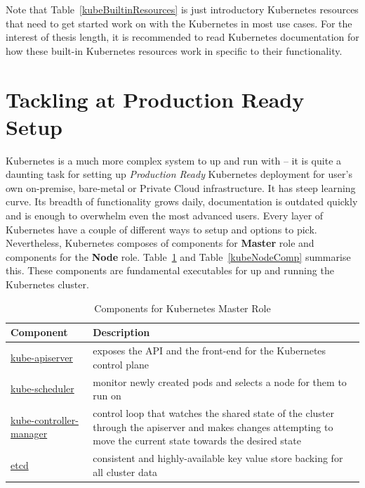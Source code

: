 Note that Table~\ref{kubeBuiltinResources} is just introductory Kubernetes resources that need to get started work on with the Kubernetes in most use cases. For the interest of thesis length, it is recommended to read Kubernetes documentation \parencite{kubeDoc} for how these built-in Kubernetes resources work in specific to their functionality.

\section{Tackling at Production Ready Setup}

Kubernetes is a much more complex system to up and run with -- it is quite a daunting task for setting up \emph{Production Ready} Kubernetes deployment for user's own on-premise, bare-metal or Private Cloud infrastructure. It has steep learning curve. Its breadth of functionality grows daily, documentation is outdated quickly and is enough to overwhelm even the most advanced users. Every layer of Kubernetes have a couple of different ways to setup and options to pick. Nevertheless, Kubernetes composes of components for \textbf{Master} role and components for the \textbf{Node} role. Table~\ref{kubeMasterComp} and Table~\ref{kubeNodeComp} summarise this. These components are fundamental executables for up and running the Kubernetes cluster. 

\begin{table}[H]
\centering
    \begin{tabular}{ | l | p{10cm} |}
    \hline
    Component & Description \\ \hline
    \href{https://kubernetes.io/docs/reference/command-line-tools-reference/kube-apiserver/}{kube-apiserver} & exposes the API and the front-end for the Kubernetes control plane \\ \hline
    \href{https://kubernetes.io/docs/reference/command-line-tools-reference/kube-scheduler/}{kube-scheduler} & monitor newly created pods and selects a node for them to run on \\ \hline
    \href{https://kubernetes.io/docs/reference/command-line-tools-reference/kube-controller-manager/}{kube-controller-manager} & control loop that watches the shared state of the cluster through the apiserver and makes changes attempting to move the current state towards the desired state \\ \hline
    \href{https://kubernetes.io/docs/tasks/administer-cluster/configure-upgrade-etcd/}{etcd} & consistent and highly-available key value store backing for all cluster data \\
    \hline
    \end{tabular}
\caption{Components for Kubernetes Master Role}
\label{kubeMasterComp}
\end{table}


